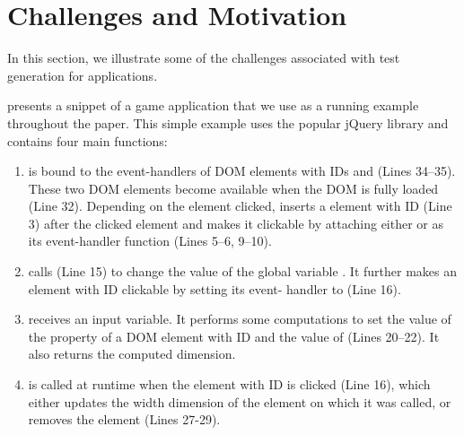 \section{Challenges and Motivation} \label{Sec:motivation}

 

In this section, we illustrate some of the challenges associated with test generation for \javascript applications. 
%

 presents a snippet of a \javascript game application that we use as a running example throughout the paper. This simple example uses the popular jQuery library \cite{jquery-api} and contains four main \javascript functions: 

\begin{enumerate} [noitemsep]

\item {} is bound to the event-handlers of DOM elements with IDs  and   (Lines 34--35). These two DOM elements become available when the DOM is fully loaded (Line 32). Depending on the element clicked,  inserts a  element with ID  (Line 3) after the clicked element and makes it clickable by attaching either  or  as its event-handler function (Lines 5--6, 9--10).    

\item {} calls  (Line 15) to change the value of the global variable . It further makes an element with ID  clickable by setting its event- handler to  (Line 16).

\item {} receives an input variable. It performs some computations to set the  value of the  property of a DOM element with ID   and the value of  (Lines 20--22). It also returns the computed dimension.

\item {} is called at runtime when the element with ID  is clicked (Line 16), which either updates the width dimension of the element on which it was called, or removes the element (Lines 27-29).
\end{enumerate}

